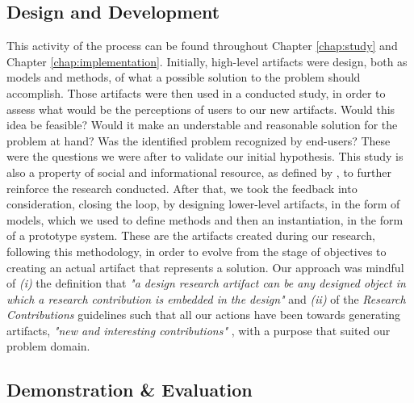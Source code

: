 \subsection{Design and Development}

This activity of the process can be found throughout Chapter \ref{chap:study} and Chapter \ref{chap:implementation}. Initially, high-level artifacts were design, both as models and methods, of what a possible solution to the problem should accomplish. Those artifacts were then used in a conducted study, in order to assess what would be the perceptions of users to our new artifacts. Would this idea be feasible? Would it make an understable and reasonable solution for the problem at hand? Was the identified problem recognized by end-users? These were the questions we were after to validate our initial hypothesis. This study is also a property of social and informational resource, as defined by \citeauthor{peffers_design_2007}, to further reinforce the research conducted. After that, we took the feedback into consideration, closing the loop, by designing lower-level artifacts, in the form of models, which we used to define methods and then an instantiation, in the form of a prototype system. These are the artifacts created during our research, following this methodology, in order to evolve from the stage of objectives to creating an actual artifact that represents a solution. Our approach was mindful of \emph{(i)} the definition that \textit{"a design research artifact can be any designed object in which a research contribution is embedded in the design"} \cite[13]{peffers_design_2007} and \emph{(ii)} of the \textit{Research Contributions} guidelines \cite[87]{hevner_design_2004} such that all our actions have been towards generating artifacts, \textit{"new and interesting contributions"} \cite[87]{hevner_design_2004}, with a purpose that suited our problem domain.

\subsection{Demonstration \& Evaluation}


